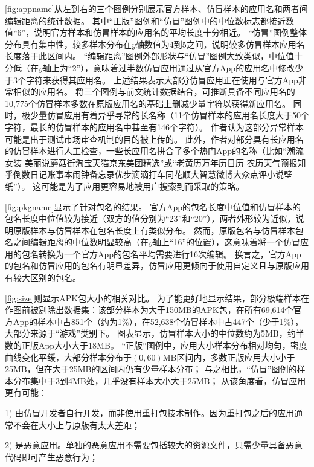 \autoref{fig:appname}从左到右的三个图例分别展示官方样本、仿冒样本的应用名和两者间编辑距离的统计数据。
其中``正版''图例和``仿冒''图例中的中位数标志都接近数值``6''，说明官方样本和仿冒样本的应用名的平均长度十分相近。
``仿冒''图例整体分布具有集中性，较多样本分布在$y$轴数值为4到5之间，说明较多仿冒样本应用名长度落于此区间内。
``编辑距离''图例外部形状与``仿冒''图例大致类似，中位值十分低（在$y$轴上为``2''），意味着过半数仿冒应用通过从官方App的应用名中修改少于3个字符来获得其应用名。
上述结果表示大部分仿冒应用正在使用与官方App非常相似的应用名。
将三个图例与前文统计数据结合，可推断具备不同应用名的10,775个仿冒样本多数在原版应用名的基础上删减少量字符以获得新应用名。
同时，极少量仿冒应用有着异乎寻常的长名称（11个仿冒样本的应用名长度大于50个字符，最长的仿冒样本的应用名中甚至有146个字符）。
作者认为这部分异常样本可能是出于测试市场审查机制的目的被上传的。
此外，作者对部分具有长应用名的仿冒样本进行人工检查，一些长应用名拼合了多个热门App的名称（比如``潮流女装-美丽说蘑菇街淘宝天猫京东美团精选''或``老黄历万年历日历-农历天气预报知乎倒数日记账事本闹钟备忘录优步滴滴打车同花顺大智慧微博大众点评小说壁纸''）。
这可能是为了应用更容易地被用户搜索到而采取的策略。

\autoref{fig:pkgname}显示了针对包名的结果。
官方App的包名长度中位值和仿冒样本的包名长度中位值较为接近（双方的值分别为``23''和``20''），两者外形较为近似，说明原版样本与仿冒样本在包名长度上有类似分布。
然而，原版包名与仿冒样本包名之间编辑距离的中位数明显较高（在$y$轴上``16''的位置），这意味着将一个仿冒应用的包名转换为一个官方App的包名平均需要进行16次编辑。
换言之，官方App的包名和仿冒应用的包名有明显差异，仿冒应用更倾向于使用自定义且与原版应用有较大区别的包名。

\autoref{fig:size}则显示APK包大小的相关对比。
为了能更好地显示结果，部分极端样本在作图前被剔除出数据集：该部分样本为大于150MB的APK包，在所有69,614个官方App的样本中占851个（约为1\%），在52,638个仿冒样本中占447个（少于1\%），大部分来源于``游戏''类别下。
图表显示，仿冒样本大小的中位数约为5MB，约半数的正版App大小大于18MB。
``正版''图例中，应用大小样本分布相对均匀，密度曲线变化平缓，大部分样本分布于$(0, 60)$MB区间内，多数正版应用大小小于25MB，但在大于25MB的区间内仍有少量样本分布；
与之相比，``仿冒''图例的样本分布集中于3到4MB处，几乎没有样本大小大于25MB；
从该角度看，仿冒应用更有可能：

1) 由仿冒开发者自行开发，而非使用重打包技术制作。因为重打包之后的应用通常不会在大小上与原版有太大差距；

2) 是恶意应用。单独的恶意应用不需要包括较大的资源文件，只需少量具备恶意代码即可产生恶意行为；

